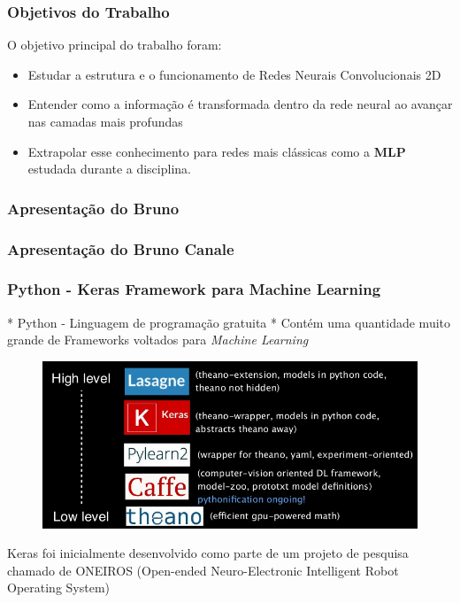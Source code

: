 \documentclass[11pt]{beamer}
\begin{document}
	\frame[plain]{\maketitle}

    \begin{frame}
      \frametitle{Objetivos do Trabalho}

      O objetivo principal do trabalho foram:

      \begin{itemize}
        \item Estudar a estrutura e o funcionamento de Redes Neurais
          Convolucionais 2D
        \item Entender como a informação é transformada dentro da
            rede neural ao avançar nas camadas mais profundas
        \item Extrapolar esse conhecimento para redes mais
              clássicas como a \textbf{MLP} estudada durante a
              disciplina.
      \end{itemize}
    \end{frame}

    \begin{frame}
      \frametitle{Apresentação do Bruno}
    \end{frame}

    \begin{frame}
      \frametitle{Apresentação do Bruno Canale}
    \end{frame}

	\begin{frame}
      \frametitle{Python - Keras Framework para Machine Learning}

      * Python - Linguagem de programação gratuita \newline
      * Contém uma quantidade muito grande de Frameworks voltados para
      \textit{Machine Learning}
      

      \begin{figure}
        \centering
        \includegraphics[scale=0.3]{road_map}
      \end{figure}

      Keras foi inicialmente desenvolvido como parte de um projeto de
      pesquisa chamado de ONEIROS (Open-ended Neuro-Electronic
      Intelligent Robot Operating System)

    \end{frame}
\end{document}
